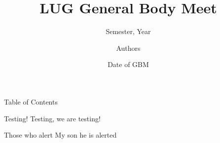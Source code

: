 \documentclass{beamer}
\title{LUG General Body Meet}
\subtitle{Semester, Year}
\date{Date of GBM}
\author{Authors}
\institute{Linux Users Group @ UIC}
\begin{document}
  \begin{frame}
    \titlepage
  \end{frame}

  \begin{frame}{Table of Contents}
    \tableofcontents
  \end{frame}

  \begin{frame}{Testing!}
    Testing, we are testing!

    \begin{alertblock}{Those who alert}
      My son he is alerted
    \end{alertblock}

  \end{frame}
\end{document}
